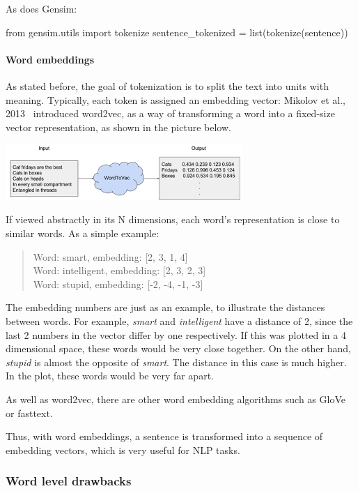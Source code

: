 As does Gensim:

\begin{python}
from gensim.utils import tokenize
sentence_tokenized = list(tokenize(sentence))
\end{python}

\paragraph{Word embeddings}\label{subsec:wordemb}

As stated before, the goal of tokenization is to split the text into units with meaning. Typically, each token is assigned an embedding vector: Mikolov et al., 2013~\cite{mikolov2013efficient} introduced word2vec, as a way of transforming a word into a fixed-size vector representation, as shown in the picture below.

\includegraphics[width=9cm]{figures/word_emb.png}

If viewed abstractly in its N dimensions, each word's representation is close to similar words. As a simple example:

\begin{quote}
    Word: smart, embedding: [2, 3, 1, 4]\\
    Word: intelligent, embedding: [2, 3, 2, 3]\\
    Word: stupid, embedding: [-2, -4, -1, -3]
\end{quote}

The embedding numbers are just as an example, to illustrate the distances between words. For example, \emph{smart} and \emph{intelligent} have a distance of 2, since the last 2 numbers in the vector differ by one respectively. If this was plotted in a 4 dimensional space, these words would be very close together. On the other hand, \emph{stupid} is almost the opposite of \emph{smart}. The distance in this case is much higher. In the plot, these words would be very far apart.

As well as word2vec, there are other word embedding algorithms such as GloVe or fasttext.

Thus, with word embeddings, a sentence is transformed into a sequence of embedding vectors, which is very useful for NLP tasks.

\subsubsection{Word level drawbacks}

